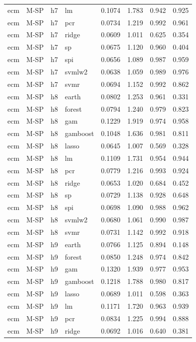 \begin{ThreePartTable}
\begin{longtable}[t]{llclcccc}
ecm & M-SP & h7 & lm & 0.1074 & 1.783 & 0.942 & 0.925\\
ecm & M-SP & h7 & pcr & 0.0734 & 1.219 & 0.992 & 0.961\\
ecm & M-SP & h7 & ridge & 0.0609 & 1.011 & 0.625 & 0.354\\
ecm & M-SP & h7 & sp & 0.0675 & 1.120 & 0.960 & 0.404\\
ecm & M-SP & h7 & spi & 0.0656 & 1.089 & 0.987 & 0.959\\
ecm & M-SP & h7 & svmlw2 & 0.0638 & 1.059 & 0.989 & 0.976\\
ecm & M-SP & h7 & svmr & 0.0694 & 1.152 & 0.992 & 0.862\\
\addlinespace
ecm & M-SP & h8 & earth & 0.0802 & 1.253 & 0.961 & 0.331\\
ecm & M-SP & h8 & forest & 0.0794 & 1.240 & 0.979 & 0.823\\
ecm & M-SP & h8 & gam & 0.1229 & 1.919 & 0.974 & 0.958\\
ecm & M-SP & h8 & gamboost & 0.1048 & 1.636 & 0.981 & 0.811\\
ecm & M-SP & h8 & lasso & 0.0645 & 1.007 & 0.569 & 0.328\\
ecm & M-SP & h8 & lm & 0.1109 & 1.731 & 0.954 & 0.944\\
ecm & M-SP & h8 & pcr & 0.0779 & 1.216 & 0.993 & 0.924\\
ecm & M-SP & h8 & ridge & 0.0653 & 1.020 & 0.684 & 0.452\\
ecm & M-SP & h8 & sp & 0.0729 & 1.138 & 0.928 & 0.648\\
ecm & M-SP & h8 & spi & 0.0698 & 1.090 & 0.988 & 0.962\\
ecm & M-SP & h8 & svmlw2 & 0.0680 & 1.061 & 0.990 & 0.987\\
ecm & M-SP & h8 & svmr & 0.0731 & 1.142 & 0.992 & 0.918\\
\addlinespace
ecm & M-SP & h9 & earth & 0.0766 & 1.125 & 0.894 & 0.148\\
ecm & M-SP & h9 & forest & 0.0850 & 1.248 & 0.974 & 0.842\\
ecm & M-SP & h9 & gam & 0.1320 & 1.939 & 0.977 & 0.953\\
ecm & M-SP & h9 & gamboost & 0.1218 & 1.788 & 0.980 & 0.817\\
ecm & M-SP & h9 & lasso & 0.0689 & 1.011 & 0.598 & 0.363\\
ecm & M-SP & h9 & lm & 0.1171 & 1.720 & 0.963 & 0.939\\
ecm & M-SP & h9 & pcr & 0.0834 & 1.225 & 0.994 & 0.888\\
ecm & M-SP & h9 & ridge & 0.0692 & 1.016 & 0.640 & 0.381\\

\end{longtable}
\end{ThreePartTable}
